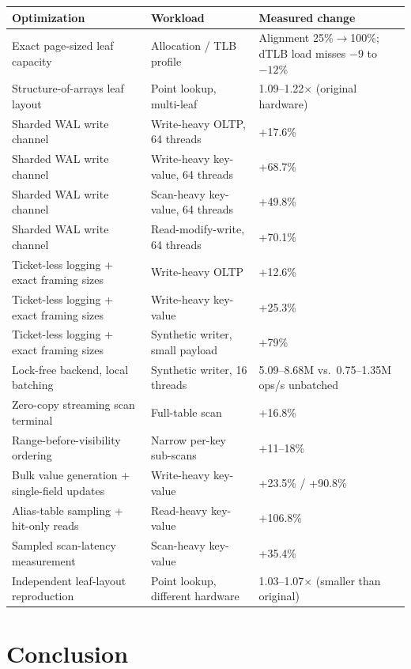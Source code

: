 \documentclass[11pt]{article}
\begin{document}
\begin{center}
\begin{tabular}{p{5.4cm}p{4.2cm}p{4.6cm}}
\toprule
\textbf{Optimization} & \textbf{Workload} & \textbf{Measured change} \\
\midrule
Exact page-sized leaf capacity & Allocation / TLB profile & Alignment 25\%$\to$100\%; dTLB load misses $-9$ to $-12$\% \\
Structure-of-arrays leaf layout & Point lookup, multi-leaf & 1.09--1.22$\times$ (original hardware) \\
Sharded WAL write channel & Write-heavy OLTP, 64 threads & +17.6\% \\
Sharded WAL write channel & Write-heavy key-value, 64 threads & +68.7\% \\
Sharded WAL write channel & Scan-heavy key-value, 64 threads & +49.8\% \\
Sharded WAL write channel & Read-modify-write, 64 threads & +70.1\% \\
Ticket-less logging + exact framing sizes & Write-heavy OLTP & +12.6\% \\
Ticket-less logging + exact framing sizes & Write-heavy key-value & +25.3\% \\
Ticket-less logging + exact framing sizes & Synthetic writer, small payload & +79\% \\
Lock-free backend, local batching & Synthetic writer, 16 threads & 5.09--8.68M vs.\ 0.75--1.35M ops/s unbatched \\
Zero-copy streaming scan terminal & Full-table scan & +16.8\% \\
Range-before-visibility ordering & Narrow per-key sub-scans & +11--18\% \\
Bulk value generation + single-field updates & Write-heavy key-value & +23.5\% / +90.8\% \\
Alias-table sampling + hit-only reads & Read-heavy key-value & +106.8\% \\
Sampled scan-latency measurement & Scan-heavy key-value & +35.4\% \\
Independent leaf-layout reproduction & Point lookup, different hardware & 1.03--1.07$\times$ (smaller than original) \\
\bottomrule
\end{tabular}
\end{center}

\section{Conclusion}
\label{sec:conclusion}
\end{document}
